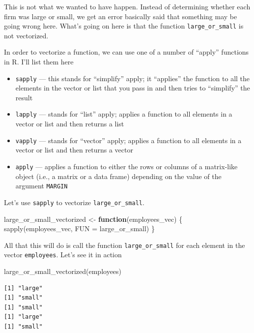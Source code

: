 \documentclass[
  letterpaper,
  DIV=11,
  numbers=noendperiod]{scrreprt}
\newenvironment{Shaded}{\begin{snugshade}}{\end{snugshade}}
\newcommand{\AttributeTok}[1]{\textcolor[rgb]{0.40,0.45,0.13}{#1}}
\newcommand{\ControlFlowTok}[1]{\textcolor[rgb]{0.00,0.23,0.31}{\textbf{#1}}}
\newcommand{\FunctionTok}[1]{\textcolor[rgb]{0.28,0.35,0.67}{#1}}
\newcommand{\NormalTok}[1]{\textcolor[rgb]{0.00,0.23,0.31}{#1}}
\newcommand{\OtherTok}[1]{\textcolor[rgb]{0.00,0.23,0.31}{#1}}
\begin{document}
This is not what we wanted to have happen. Instead of determining
whether each firm was large or small, we get an error basically said
that something may be going wrong here. What's going on here is that the
function \texttt{large\_or\_small} is not vectorized.

In order to vectorize a function, we can use one of a number of
``apply'' functions in R. I'll list them here

\begin{itemize}
\item
  \texttt{sapply} --- this stands for ``simplify'' apply; it ``applies''
  the function to all the elements in the vector or list that you pass
  in and then tries to ``simplify'' the result
\item
  \texttt{lapply} --- stands for ``list'' apply; applies a function to
  all elements in a vector or list and then returns a list
\item
  \texttt{vapply} --- stands for ``vector'' apply; applies a function to
  all elements in a vector or list and then returns a vector
\item
  \texttt{apply} --- applies a function to either the rows or columns of
  a matrix-like object (i.e., a matrix or a data frame) depending on the
  value of the argument \texttt{MARGIN}
\end{itemize}

Let's use \texttt{sapply} to vectorize \texttt{large\_or\_small}.

\begin{Shaded}
\begin{Highlighting}[]
\NormalTok{large\_or\_small\_vectorized }\OtherTok{\textless{}{-}} \ControlFlowTok{function}\NormalTok{(employees\_vec) \{}
  \FunctionTok{sapply}\NormalTok{(employees\_vec, }\AttributeTok{FUN =}\NormalTok{ large\_or\_small)}
\NormalTok{\}}
\end{Highlighting}
\end{Shaded}

All that this will do is call the function \texttt{large\_or\_small} for
each element in the vector \texttt{employees}. Let's see it in action

\begin{Shaded}
\begin{Highlighting}[]
\FunctionTok{large\_or\_small\_vectorized}\NormalTok{(employees)}
\end{Highlighting}
\end{Shaded}

\begin{verbatim}
[1] "large"
[1] "small"
[1] "small"
[1] "large"
[1] "small"
\end{verbatim}
\end{document}

